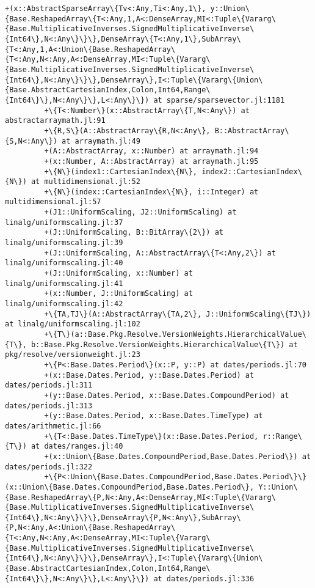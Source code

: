 \documentclass[11pt]{article}
\begin{document}
\begin{Verbatim}[commandchars=\\\{\}]
         +(x::AbstractSparseArray\{Tv<:Any,Ti<:Any,1\}, y::Union\{Base.ReshapedArray\{T<:Any,1,A<:DenseArray,MI<:Tuple\{Vararg\{Base.MultiplicativeInverses.SignedMultiplicativeInverse\{Int64\},N<:Any\}\}\},DenseArray\{T<:Any,1\},SubArray\{T<:Any,1,A<:Union\{Base.ReshapedArray\{T<:Any,N<:Any,A<:DenseArray,MI<:Tuple\{Vararg\{Base.MultiplicativeInverses.SignedMultiplicativeInverse\{Int64\},N<:Any\}\}\},DenseArray\},I<:Tuple\{Vararg\{Union\{Base.AbstractCartesianIndex,Colon,Int64,Range\{Int64\}\},N<:Any\}\},L<:Any\}\}) at sparse/sparsevector.jl:1181
         +\{T<:Number\}(x::AbstractArray\{T,N<:Any\}) at abstractarraymath.jl:91
         +\{R,S\}(A::AbstractArray\{R,N<:Any\}, B::AbstractArray\{S,N<:Any\}) at arraymath.jl:49
         +(A::AbstractArray, x::Number) at arraymath.jl:94
         +(x::Number, A::AbstractArray) at arraymath.jl:95
         +\{N\}(index1::CartesianIndex\{N\}, index2::CartesianIndex\{N\}) at multidimensional.jl:52
         +\{N\}(index::CartesianIndex\{N\}, i::Integer) at multidimensional.jl:57
         +(J1::UniformScaling, J2::UniformScaling) at linalg/uniformscaling.jl:37
         +(J::UniformScaling, B::BitArray\{2\}) at linalg/uniformscaling.jl:39
         +(J::UniformScaling, A::AbstractArray\{T<:Any,2\}) at linalg/uniformscaling.jl:40
         +(J::UniformScaling, x::Number) at linalg/uniformscaling.jl:41
         +(x::Number, J::UniformScaling) at linalg/uniformscaling.jl:42
         +\{TA,TJ\}(A::AbstractArray\{TA,2\}, J::UniformScaling\{TJ\}) at linalg/uniformscaling.jl:102
         +\{T\}(a::Base.Pkg.Resolve.VersionWeights.HierarchicalValue\{T\}, b::Base.Pkg.Resolve.VersionWeights.HierarchicalValue\{T\}) at pkg/resolve/versionweight.jl:23
         +\{P<:Base.Dates.Period\}(x::P, y::P) at dates/periods.jl:70
         +(x::Base.Dates.Period, y::Base.Dates.Period) at dates/periods.jl:311
         +(y::Base.Dates.Period, x::Base.Dates.CompoundPeriod) at dates/periods.jl:313
         +(y::Base.Dates.Period, x::Base.Dates.TimeType) at dates/arithmetic.jl:66
         +\{T<:Base.Dates.TimeType\}(x::Base.Dates.Period, r::Range\{T\}) at dates/ranges.jl:40
         +(x::Union\{Base.Dates.CompoundPeriod,Base.Dates.Period\}) at dates/periods.jl:322
         +\{P<:Union\{Base.Dates.CompoundPeriod,Base.Dates.Period\}\}(x::Union\{Base.Dates.CompoundPeriod,Base.Dates.Period\}, Y::Union\{Base.ReshapedArray\{P,N<:Any,A<:DenseArray,MI<:Tuple\{Vararg\{Base.MultiplicativeInverses.SignedMultiplicativeInverse\{Int64\},N<:Any\}\}\},DenseArray\{P,N<:Any\},SubArray\{P,N<:Any,A<:Union\{Base.ReshapedArray\{T<:Any,N<:Any,A<:DenseArray,MI<:Tuple\{Vararg\{Base.MultiplicativeInverses.SignedMultiplicativeInverse\{Int64\},N<:Any\}\}\},DenseArray\},I<:Tuple\{Vararg\{Union\{Base.AbstractCartesianIndex,Colon,Int64,Range\{Int64\}\},N<:Any\}\},L<:Any\}\}) at dates/periods.jl:336

\end{Verbatim}
\end{document}
